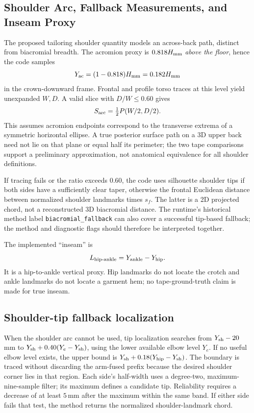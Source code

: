 \documentclass[11pt,a4paper]{article}
\numberwithin{equation}{section}
\begin{document}
\subsection{Shoulder Arc, Fallback Measurements, and Inseam Proxy}
\label{subsec:shoulder_arc}
The proposed tailoring shoulder quantity models an across-back path, distinct from biacromial breadth. The acromion proxy is $0.818H_{\rm mm}$ \emph{above the floor}, hence the code samples
\begin{equation}
Y_{\rm ac}=(1-0.818)H_{\rm mm}=0.182H_{\rm mm}
\end{equation}
in the crown-downward frame. Frontal and profile torso traces at this level yield unexpanded $W,D$. A valid slice with $D/W\le0.60$ gives
\begin{equation}
S_{\rm arc}=\tfrac12P(W/2,D/2).
\label{eq:shoulder_arc}
\end{equation}
This assumes acromion endpoints correspond to the transverse extrema of a symmetric horizontal ellipse. A true posterior surface path on a 3D upper back need not lie on that plane or equal half its perimeter; the two tape comparisons support a preliminary approximation, not anatomical equivalence for all shoulder definitions.

If tracing fails or the ratio exceeds $0.60$, the code uses silhouette shoulder tips if both sides have a sufficiently clear taper, otherwise the frontal Euclidean distance between normalized shoulder landmarks times $s_f$. The latter is a 2D projected chord, not a reconstructed 3D biacromial distance. The runtime's historical method label \texttt{biacromial\_fallback} can also cover a successful tip-based fallback; the method and diagnostic flags should therefore be interpreted together.

\label{subsec:linear_measurements}
The implemented ``inseam'' is
\begin{equation}
L_{\rm hip\text{-}ankle}=Y_{\rm ankle}-Y_{\rm hip}.
\end{equation}
It is a hip-to-ankle vertical proxy. Hip landmarks do not locate the crotch and ankle landmarks do not locate a garment hem; no tape-ground-truth claim is made for true inseam.

\subsection{Shoulder-tip fallback localization}
When the shoulder arc cannot be used, tip localization searches from $Y_{\rm sh}-20$\,mm to $Y_{\rm sh}+0.40(Y_e-Y_{\rm sh})$, using the lower available elbow level $Y_e$. If no useful elbow level exists, the upper bound is $Y_{\rm sh}+0.18(Y_{\rm hip}-Y_{\rm sh})$. The boundary is traced without discarding the arm-fused prefix because the desired shoulder corner lies in that region. Each side's half-width uses a degree-two, maximum-nine-sample filter; its maximum defines a candidate tip. Reliability requires a decrease of at least $5$\,mm after the maximum within the same band. If either side fails that test, the method returns the normalized shoulder-landmark chord.
\end{document}
